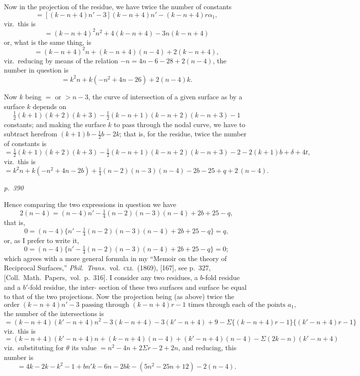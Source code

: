 \documentclass[11pt,a4paper]{book}
\begin{document}
Now in the projection of the residue, we have twice the number of constants
\[
= [(k - n + 4) n' - 3](k - n + 4)n' - (k - n + 4) r \alpha_1,
\]
viz.\ this is
\[
= (k - n + 4)^2 n^2 + 4(k - n + 4) - 3n(k - n + 4)
\]
or, what is the same thing, is
\[
= (k - n + 4)^2 n + (k - n + 4)(n - 4) + 2(k - n + 4),
\]
viz.\ reducing by means of the relation $-n = 4n - 6 - 28 + 2(n - 4)$, the number in
question is
\[
= k^2n + k(-n^2 + 4n - 26) + 2(n - 4) k.
\]

Now $k$ being $=$ or $> n - 3$, the curve of intersection of a given surface as by a
surface $k$ depends on
\[
\tfrac{1}{2}(k + 1)(k + 2)(k + 3) - \tfrac{1}{2}(k - n + 1)(k - n + 2)(k - n + 3) - 1
\]
constants; and making the surface $k$ to pass through the nodal curve, we have to subtract
herefrom $(k + 1)b - \tfrac{1}{2}b - 2k$; that is, for the residue, twice the number of constants is
\[
= \tfrac{1}{2}(k + 1)(k + 2)(k + 3) - \tfrac{1}{2}(k - n + 1)(k - n + 2)(k - n + 3) - 2 - 2(k + 1)b + \delta + 4t,
\]
viz.\ this is
\[
= k^2 n + k(-n^2 + 4n - 2b) + \tfrac{1}{4}(n - 2)(n - 3)(n - 4) - 2b - 25 + q + 2\,(n - 4).
\]

\clearpage

\bigskip
\textit{p.~390}
\smallskip

\noindent
Hence comparing the two expressions in question we have
\[
2(n - 4) = (n - 4)n' - \tfrac{1}{4}(n - 2)(n - 3)(n - 4) + 2 b + 25 - q,
\]
that is,
\[
0 = (n - 4)\{n' - \tfrac{1}{4}(n - 2)(n - 3)(n - 4) + 2 b + 25 - q\} = q,
\]
or, as I prefer to write it,
\[
0 = (n - 4) \{n' - \tfrac{1}{4}(n - 2)(n - 3)(n - 4) + 2 b + 25 - q\} = 0;
\]
which agrees with a more general formula in my ``Memoir on the theory of Reciprocal
Surfaces,'' \textit{Phil.\ Trans.}\ vol.\ \textsc{cli}.\ (1869), [167], see p.\ 327, [Coll.\ Math.\ Papers,\ vol.\
p.\ 316].  I consider any two residues, a $b$-fold residue and a $b'$-fold residue, the inter-
section of these two surfaces and surface be equal to that of the two projections.  Now
the projection being (as above) twice the
\[
\text{order } (k - n + 4)n' - 3 \text{ passing through } (k - n + 4)r - 1 \text{ times through each of the points } a_1,
\]
the number of the intersections is
\[
= (k - n + 4)(k' - n + 4)n^2 - 3(k - n + 4) - 3(k' - n + 4) + 9 - \Sigma\{(k - n + 4)r - 1\}\{(k' - n + 4)r - 1\}
\]
viz.\ this is
\[
= (k - n + 4)(k' - n + 4)n + (k - n + 4)(n - 4) + (k' - n + 4)(n - 4) - \Sigma(2k - n)(k' - n + 4)
\]
viz.\ substituting for $\theta$ its value $= n^2 - 4n + 2 \Sigma r - 2 + 2n$, and reducing, this number is
\[
= 4k - 2k - k^2 - 1 + bn'k - 6n - 2 b k - (5n^2 - 25n + 12) - 2(n - 4).
\]
\end{document}
